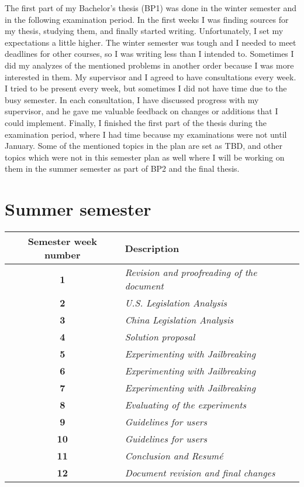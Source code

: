 The first part of my Bachelor's thesis (BP1) was done in the winter semester and in the following examination period. In the first weeks I was finding sources for my thesis, studying them, and finally started writing. Unfortunately, I set my expectations a little higher. The winter semester was tough and I needed to meet deadlines for other courses, so I was writing less than I intended to. Sometimes I did my analyzes of the mentioned problems in another order because I was more interested in them. My supervisor and I agreed to have consultations every week. I tried to be present every week, but sometimes I did not have time due to the busy semester. In each consultation, I have discussed progress with my supervisor, and he gave me valuable feedback on changes or additions that I could implement. Finally, I finished the first part of the thesis during the examination period, where I had time because my examinations were not until January. Some of the mentioned topics in the plan are set as TBD, and other topics which were not in this semester plan as well where I will be working on them in the summer semester as part of BP2 and the final thesis.


\newpage


\section*{Summer semester}

\begin{table}[hp]
    \centering
    \begin{tabular}{|c|l|}
    \hline
    \cellcolor[gray]{0.8}\textbf{Semester week number} & \cellcolor[gray]{0.8}\textbf{Description} \\ \hline

    \textbf{1} & \textit{Revision and proofreading of the document} \\ \hline
    \textbf{2} & \textit{U.S. Legislation Analysis} \\ \hline
    \textbf{3} & \textit{China Legislation Analysis} \\ \hline
    \textbf{4} & \textit{Solution proposal} \\ \hline
    \textbf{5} & \textit{Experimenting with Jailbreaking} \\ \hline
    \textbf{6} & \textit{Experimenting with Jailbreaking} \\ \hline
    \textbf{7} & \textit{Experimenting with Jailbreaking} \\ \hline
    \textbf{8} & \textit{Evaluating of the experiments} \\ \hline
    \textbf{9} & \textit{Guidelines for users} \\ \hline
    \textbf{10} & \textit{Guidelines for users} \\ \hline
    \textbf{11} & \textit{Conclusion and Resumé} \\ \hline
    \textbf{12} & \textit{Document revision and final changes} \\ \hline
    \end{tabular}
\end{table}

